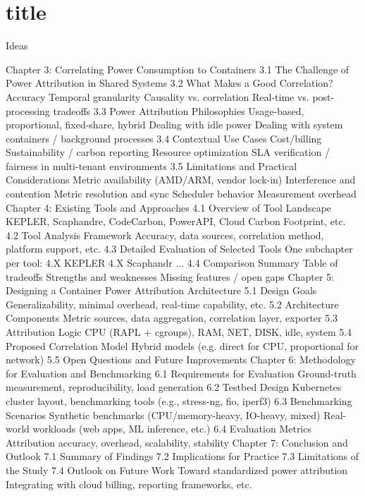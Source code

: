 \chapter{title} %

Ideas

Chapter 3: Correlating Power Consumption to Containers
    3.1 The Challenge of Power Attribution in Shared Systems
    3.2 What Makes a Good Correlation?
        Accuracy
        Temporal granularity
        Causality vs. correlation
        Real-time vs. post-processing tradeoffs
    3.3 Power Attribution Philosophies
        Usage-based, proportional, fixed-share, hybrid
        Dealing with idle power
        Dealing with system containers / background processes
    3.4 Contextual Use Cases
        Cost/billing
        Sustainability / carbon reporting
        Resource optimization
        SLA verification / fairness in multi-tenant environments
    3.5 Limitations and Practical Considerations
        Metric availability (AMD/ARM, vendor lock-in)
        Interference and contention
        Metric resolution and sync
        Scheduler behavior
        Measurement overhead
Chapter 4: Existing Tools and Approaches
    4.1 Overview of Tool Landscape
        KEPLER, Scaphandre, CodeCarbon, PowerAPI, Cloud Carbon Footprint, etc.
    4.2 Tool Analysis Framework
        Accuracy, data sources, correlation method, platform support, etc.
    4.3 Detailed Evaluation of Selected Tools
        One subchapter per tool:
            4.X KEPLER
            4.X Scaphandr
            ...
    4.4 Comparison Summary
        Table of tradeoffs
        Strengths and weaknesses
        Missing features / open gaps
Chapter 5: Designing a Container Power Attribution Architecture
    5.1 Design Goals
        Generalizability, minimal overhead, real-time capability, etc.
    5.2 Architecture Components
        Metric sources, data aggregation, correlation layer, exporter
    5.3 Attribution Logic
        CPU (RAPL + cgroups), RAM, NET, DISK, idle, system
    5.4 Proposed Correlation Model
        Hybrid models (e.g. direct for CPU, proportional for network)
    5.5 Open Questions and Future Improvements
Chapter 6: Methodology for Evaluation and Benchmarking
    6.1 Requirements for Evaluation
        Ground-truth measurement, reproducibility, load generation
    6.2 Testbed Design
        Kubernetes cluster layout, benchmarking tools (e.g., stress-ng, fio, iperf3)
    6.3 Benchmarking Scenarios
        Synthetic benchmarks (CPU/memory-heavy, IO-heavy, mixed)
        Real-world workloads (web apps, ML inference, etc.)
    6.4 Evaluation Metrics
        Attribution accuracy, overhead, scalability, stability
Chapter 7: Conclusion and Outlook
    7.1 Summary of Findings
    7.2 Implications for Practice
    7.3 Limitations of the Study
    7.4 Outlook on Future Work
        Toward standardized power attribution
        Integrating with cloud billing, reporting frameworks, etc.